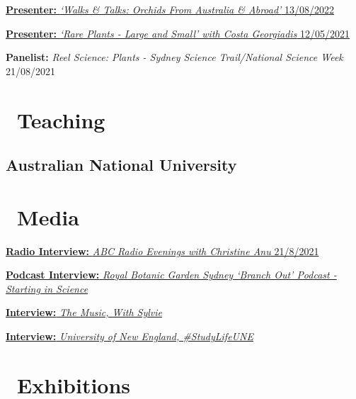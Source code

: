 \documentclass[10,a4paper,]{awesome-cv}
\begin{document}
\href{https://www.instagram.com/p/ChLqF9UuGza}{\textbf{Presenter:}
\emph{`Walks \& Talks: Orchids From Australia \& Abroad'} 13/08/2022}

\href{https://www.facebook.com/CostasWorld/videos/491418699340504/}{\textbf{Presenter:}
\emph{`Rare Plants - Large and Small' with Costa Georgiadis} 12/05/2021}

\textbf{Panelist:} \emph{Reel Science: Plants - Sydney Science
Trail/National Science Week} 21/08/2021

\hypertarget{teaching}{%
\section{\texorpdfstring{\acvHeaderIconSep~Teaching}{~Teaching}}\label{teaching}}

\hypertarget{australian-national-university}{%
\subsection{Australian National
University}\label{australian-national-university}}

\begin{cvhonors}
\end{cvhonors}

\hypertarget{media}{%
\section{\texorpdfstring{\acvHeaderIconSep~Media}{~Media}}\label{media}}

\href{https://soundcloud.app.goo.gl/qHSz4CY8nj2adUtb7}{\textbf{Radio
Interview:} \emph{ABC Radio Evenings with Christine Anu} 21/8/2021}

\href{https://www.rbgsyd.nsw.gov.au/Science/Branch-Out/Starting-in-Science}{\textbf{Podcast
Interview:} \emph{Royal Botanic Garden Sydney `Branch Out' Podcast -
Starting in Science}}

\href{https://rpodonnell.github.io/cv/sylvie_interview_2020.pdf}{\textbf{Interview:}
\emph{The Music, With Sylvie}}

\href{https://www.facebook.com/UniNewEngland/posts/10158232724220926}{\textbf{Interview:}
\emph{University of New England, \#StudyLifeUNE}}

\hypertarget{exhibitions}{%
\section{\texorpdfstring{\acvHeaderIconSep~Exhibitions}{~Exhibitions}}\label{exhibitions}}
\end{document}
